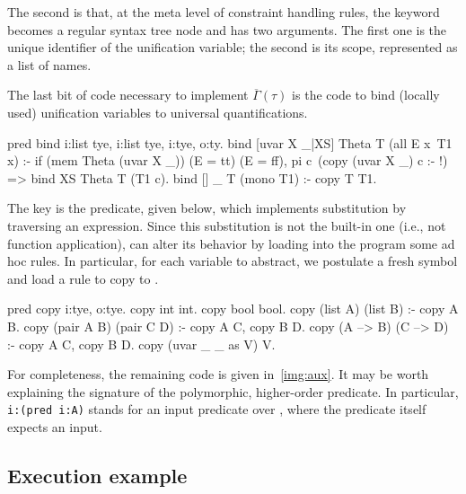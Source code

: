 \documentclass{these-ISSS}
\newenvironment{elpicode}
  {\VerbatimEnvironment\begin{elpibox}\begin{xelpicode}}{\end{xelpicode}
\end{elpibox}}
\begin{document}
The second is that, at the meta level of constraint handling rules, the
 keyword becomes a regular syntax tree node and has two arguments.
The first one is the unique identifier of the unification variable; the second is
its scope, represented as a list of names.


The last bit of code necessary to implement $\overline{\Gamma}(\tau)$ is the
code to bind (locally used) unification variables to universal
quantifications.
\begin{elpicode}
pred bind i:list tye, i:list tye, i:tye, o:ty.
bind [uvar X _|XS] Theta T (all E x\ T1 x) :-
  if (mem Theta (uvar X _)) (E = tt) (E = ff),
  pi c\ (copy (uvar X _) c :- !) => bind XS Theta T (T1 c).
bind [] _ T (mono T1) :- copy T T1. %
\end{elpicode}
The key is the  predicate, given below, which implements
substitution by traversing an expression. Since this substitution is not
the built-in one (i.e., not function application),  can alter its behavior
by loading into the program some ad hoc rules. In particular, for
each variable  to abstract, we postulate a fresh symbol
 and load a rule to copy  to .

\begin{elpicode}

pred copy i:tye, o:tye.
copy int int.
copy bool bool.
copy (list A) (list B) :- copy A B.
copy (pair A B) (pair C D) :- copy A C, copy B D.
copy (A --> B) (C --> D) :- copy A C, copy B D.
copy (uvar _ _ as V) V.
\end{elpicode}


For completeness, the remaining code is given in~\cref{img:aux}. It may be worth explaining the
signature of the polymorphic, higher-order  predicate. In
particular, \texttt{i:(pred i:A)} stands for an input predicate over
, where the predicate itself expects an input.


\subsection{Execution example}
\end{document}
